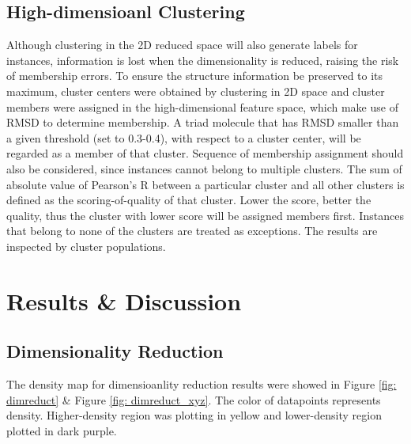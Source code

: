 \documentclass[a4paper]{article}
\begin{document}
\subsection{High-dimensioanl Clustering}
Although clustering in the 2D reduced space will also generate labels for instances, information is lost when the dimensionality is reduced, raising the risk of membership errors. To ensure the structure information be preserved to its maximum, cluster centers were obtained by clustering in 2D space and cluster members were assigned in the high-dimensional feature space, which make use of RMSD to determine membership. A triad molecule that has RMSD smaller than a given threshold (set to 0.3-0.4), with respect to a cluster center, will be regarded as a member of that cluster. Sequence of membership assignment should also be considered, since instances cannot belong to multiple clusters. The sum of absolute value of Pearson's R between a particular cluster and all other clusters is defined as the scoring-of-quality of that cluster. Lower the score, better the quality, thus the cluster with lower score will be assigned members first. Instances that belong to none of the clusters are treated as exceptions. The results are inspected by cluster populations. 

\section{Results \& Discussion}

\subsection{Dimensionality Reduction}
The density map for dimensioanlity reduction results were showed in Figure \ref{fig: dimreduct} \& Figure \ref{fig: dimreduct_xyz}. The color of datapoints represents density. Higher-density region was plotting in yellow and lower-density region plotted in dark purple.
\end{document}
